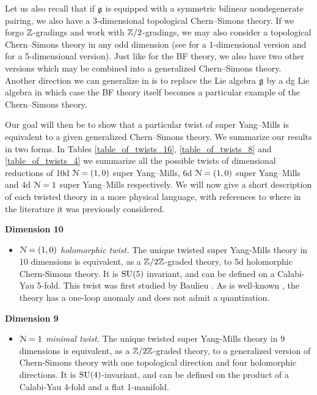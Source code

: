 \documentclass[10pt, oneside]{article}
\begin{document}
Let us also recall that if $\mathfrak g$ is equipped with a symmetric bilinear nondegenerate pairing, we also have a 3-dimensional topological Chern--Simons theory. If we forgo $\mathbb Z$-gradings and work with $\mathbb Z/2$-gradings, we may also consider a topological Chern--Simons theory in any odd dimension (see \cite{AlekseevMnev} for a 1-dimensional version and \cite{BakGustavsson2} for a 5-dimensional version). Just like for the BF theory, we also have two other versions which may be combined into a generalized Chern--Simons theory. Another direction we can generalize in is to replace the Lie algebra $\mathfrak g$ by a dg Lie algebra in which case the BF theory itself becomes a particular example of the Chern--Simons theory.

Our goal will then be to show that a particular twist of super Yang--Mills is equivalent to a given generalized Chern--Simons theory. We summarize our results in two forms. In Tables \ref{table_of_twists_16}, \ref{table_of_twists_8} and \ref{table_of_twists_4} we summarize all the possible twists of dimensional reductions of 10d $\mathcal N=(1, 0)$ super Yang--Mills, 6d $\mathcal N=(1, 0)$ super Yang--Mills and 4d $\mathcal N=1$ super Yang--Mills respectively. We will now give a short description of each twisted theory in a more physical language, with references to where in the literature it was previously considered.

\textbf{Dimension 10}
\begin{itemize}
 \item \emph{$\mathcal{N}=(1,0)$ holomorphic twist.} The unique twisted super Yang-Mills theory in 10 dimensions is equivalent, as a $\mathbb Z/2\mathbb Z$-graded theory, to 5d holomorphic Chern-Simons theory.  It is $\mathrm{SU}(5)$ invariant, and can be defined on a Calabi-Yau 5-fold.  This twist was first studied by Baulieu \cite{Baulieu}. As is well-known \cite{GSanomaly}, the theory has a one-loop anomaly and does not admit a quantization.
\end{itemize}

\textbf{Dimension 9}
\begin{itemize}
 \item \emph{$\mathcal{N}=1$ minimal twist.} The unique twisted super Yang-Mills theory in 9 dimensions is equivalent, as a $\mathbb Z/2\mathbb Z$-graded theory, to a generalized version of Chern-Simons theory with one topological direction and four holomorphic directions.  It is $\mathrm{SU}(4)$-invariant, and can be defined on the product of a Calabi-Yau 4-fold and a flat 1-manifold. 
\end{itemize}
\end{document}
